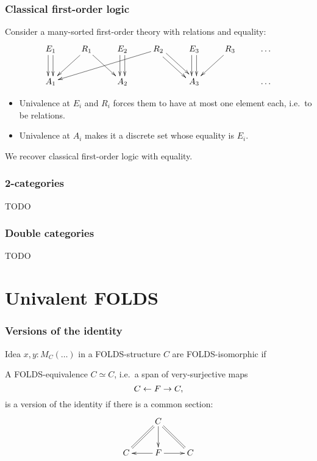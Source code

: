 \documentclass{beamer}
\begin{document}
\begin{frame}
  \frametitle{Classical first-order logic}
  Consider a many-sorted first-order theory with relations and equality:
  \[ \xymatrix{
    E_1 \ar@<1mm>[d] \ar@<-1mm>[d] & R_1 \ar[dl] \ar[dr] & E_2 \ar@<1mm>[d] \ar@<-1mm>[d] & R_2 \ar[dlll] \ar@<1mm>[dr] \ar@<-1mm>[dr] & E_3 \ar@<1mm>[d] \ar@<-1mm>[d] & R_3 \ar[dl] & \dots \\
    A_1 && A_2 && A_3 && \dots
  }\]
  \begin{itemize}
  \item Univalence at $E_i$ and $R_i$ forces them to have at most one element each, i.e.\ to be relations.
  \item Univalence at $A_i$ makes it a discrete set whose equality is $E_i$.
  \end{itemize}
  We recover classical first-order logic with equality.
\end{frame}

\begin{frame}
  \frametitle{2-categories}
  TODO
\end{frame}

\begin{frame}
  \frametitle{Double categories}
  TODO
\end{frame}


\section{Univalent FOLDS}
\label{sec:univalent-folds}

\begin{frame}
  \frametitle{Versions of the identity}
  \begin{block}{Idea}
    $x,y:M_C(\dots)$ in a FOLDS-structure $C$ are \alert<1>{FOLDS-isomorphic} if\\ 
  \end{block}
  \pause\pause\pause
  \begin{definition}
    A FOLDS-equivalence $C\simeq C$, i.e.\ a span of very-surjective maps
    \[ C \leftarrow F \to C, \]
    is \alert{a version of the identity} if there is a common section:
    \[ \xymatrix{ &C \ar[d] \ar@{=}[dl] \ar@{=}[dr] \\ C & F \ar[l] \ar[r] & C } \]
  \end{definition}
\end{frame}
\end{document}
